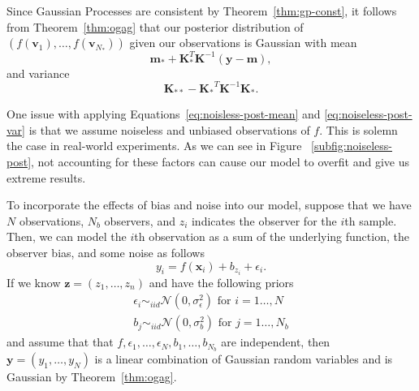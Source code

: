 Since Gaussian Processes are consistent by Theorem~\ref{thm:gp-const}, it follows from Theorem~\ref{thm:ogag} that our posterior distribution
of $(f(\mathbf{v}_1), \ldots, f(\mathbf{v}_{N_*}))$ given our observations is Gaussian with mean
\begin{equation} \label{eq:noisless-post-mean}
    \mathbf{m}_* + \mathbf{K}_*^T \mathbf{K}^{-1} (\mathbf{y} - \mathbf{m}), 
\end{equation}
and variance
\begin{equation} \label{eq:noiseless-post-var}
    \mathbf{K}_{* *} - \mathbf{K_*}^{T} \mathbf{K}^{-1} \mathbf{K_*}.
\end{equation}

One issue with applying Equations~\ref{eq:noisless-post-mean} and \ref{eq:noiseless-post-var} is that we assume noiseless and unbiased observations of $f$.
This is solemn the case in real-world experiments.
As we can see in Figure ~\ref{subfig:noiseless-post}, not accounting for these factors can cause our model to overfit and give us extreme results.

To incorporate the effects of bias and noise into our model, suppose that we have $N$ observations, $N_b$ observers, and $z_i$ indicates the observer for the $i$th sample.
Then, we can model the $i$th observation as a sum of the underlying function, the observer bias, and some noise as follows
\begin{equation*}
    y_i = f(\mathbf{x}_i) + b_{z_i} + \epsilon_i.
\end{equation*}
If we know $\mathbf{z} = (z_1, \ldots, z_n)$ 
and have the following priors
\begin{align*}
    \epsilon_i \sim_{iid} \mathcal{N}(0, \sigma^2_{\epsilon}) \text{ for $i = 1 \ldots, N$}\\
    b_j \sim_{iid} \mathcal{N}(0, \sigma_{b}^2) \text{ for $j = 1 \ldots, N_b$}
\end{align*}
and assume that that $f, \epsilon_1, \ldots, \epsilon_N, b_1, \ldots, b_{N_b}$ are independent,
then $\mathbf{y} = (y_1, \ldots, y_N)$ is a linear combination of Gaussian random variables
and is Gaussian by Theorem~\ref{thm:ogag}.

